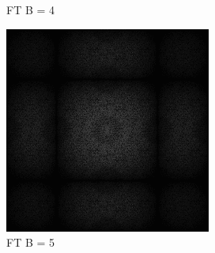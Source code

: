 \begin{figure}[H]
\begin{tcolorbox}[boxrule=4pt,sharp corners=downhill,title=Verschiedene Blockgrößen]
\begin{subfigure}[b]{0.2\linewidth}
      \caption{FT B = 4}
      \label{pic:fftB_4}
    \end{subfigure}
    \begin{subfigure}[b]{0.2\linewidth}
        \includegraphics[width=\linewidth]{content/TemporalerAlg/Bilder/Sorting/DiffDimensions/5/seed_debug_5.0_small.png}
        \caption{FT B = 5}
        \label{pic:fftB_5}
    \end{subfigure}
    \begin{subfigure}[b]{0.2\linewidth}

\end{subfigure}
\end{tcolorbox}
\end{figure}
